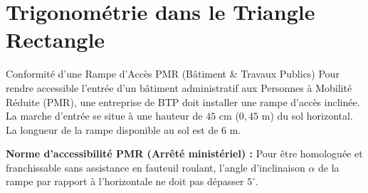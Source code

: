 \chapter{Trigonométrie dans le Triangle Rectangle}

\begin{activite}{Conformité d'une Rampe d'Accès PMR (Bâtiment \& Travaux Publics)}
Pour rendre accessible l'entrée d'un bâtiment administratif aux Personnes à Mobilité Réduite (PMR), une entreprise de BTP doit installer une rampe d'accès inclinée.
La marche d'entrée se situe à une hauteur de \textbf{$45\text{ cm}$} ($0{,}45\text{ m}$) du sol horizontal.
La longueur de la rampe disponible au sol est de \textbf{$6\text{ m}$}.

\vspace{1mm}
\begin{center}
\begin{tcolorbox}[colback=amber!10, colframe=amber!80!black, arc=4pt, boxrule=0.8pt, left=8pt, right=8pt, top=4pt, bottom=4pt]
\sffamily\footnotesize
\textbf{Norme d'accessibilité PMR (Arrêté ministériel) :}
Pour être homologuée et franchissable sans assistance en fauteuil roulant, l'angle d'inclinaison $\alpha$ de la rampe par rapport à l'horizontale ne doit pas dépasser \textbf{$5^\circ$}.
\end{tcolorbox}
\end{center}

\vspace{1mm}
\noindent
\begin{minipage}[c]{0.48\linewidth}
\centering
{}
\end{minipage}
\end{activite}
